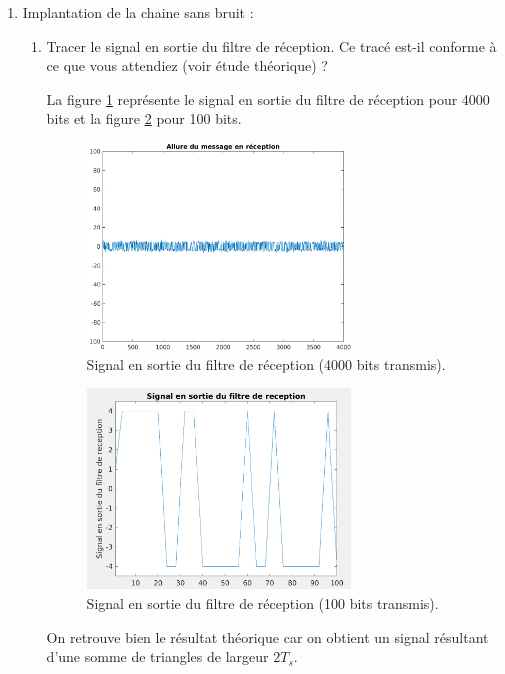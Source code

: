\documentclass[frenchb]{article}
\begin{document}
\begin{enumerate}
        \item Implantation de la chaine sans bruit :
            \begin{enumerate}
                \item Tracer le signal en sortie du filtre de réception. Ce tracé est-il conforme à ce que vous attendiez (voir étude théorique) ?
                
                \par\leavevmode\par
       			 \setlength\parindent{0.5cm}
        		 La figure \ref{fig : C1F1} représente  le signal en sortie du filtre de réception pour 4000 bits et la figure \ref{fig : C1F12} pour 100 bits.
        
                 \begin{figure}[ht!]
		         \centering
		         \includegraphics[width=7cm]{C1F1.png}		              			     \caption{Signal en sortie du filtre de réception (4000 bits transmis). \label{fig : C1F1}}
		         \end{figure}
		         
		         \begin{figure}[ht!]
		         \centering
		         \includegraphics[width=7cm]{C1F12.png}		              			     \caption{Signal en sortie du filtre de réception (100 bits transmis). \label{fig : C1F12}}
		         \end{figure}
				\newpage
				On retrouve bien le résultat théorique car on obtient un signal résultant d'une somme de triangles de largeur $2 T_s$. 
				\par\leavevmode\par


\end{enumerate}
\end{enumerate}
\end{document}
